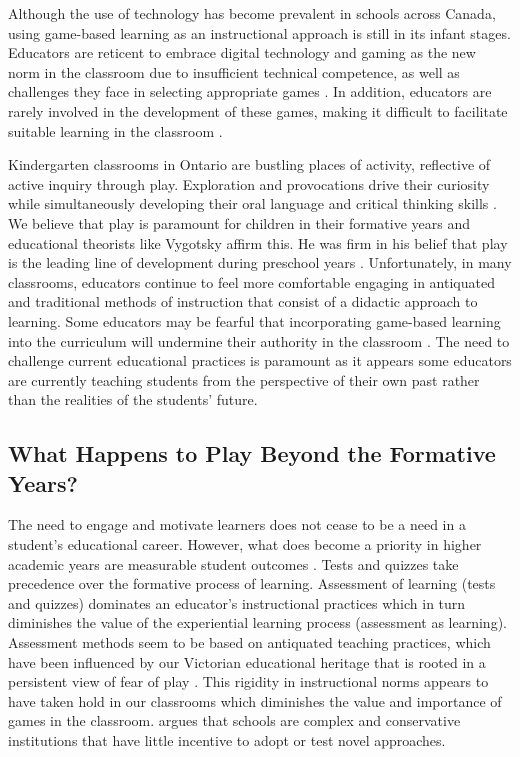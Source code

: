 \documentclass{article}
\begin{document}
Although the use of technology has become prevalent in schools across Canada, using game-based learning as an instructional approach is still in its infant stages. Educators are reticent to embrace digital technology and gaming as the new norm in the classroom due to insufficient technical competence, as well as challenges they face in selecting appropriate games \citep{jaaska2022teachers,molin2017role}. In addition, educators are rarely involved in the development of these games, making it difficult to facilitate suitable learning in the classroom \citep{molin2017role}. 

Kindergarten classrooms in Ontario are bustling places of activity, reflective of active inquiry through play. Exploration and provocations drive their curiosity while simultaneously developing their oral language and critical thinking skills \citep{kindergartencurriculum}. We believe that play is paramount for children in their formative years and educational theorists like Vygotsky affirm this. He was firm in his belief that play is the leading line of development during preschool years \citep{vygotsky1967play}. Unfortunately, in many classrooms, educators continue to feel more comfortable engaging in antiquated and traditional methods of instruction that consist of a didactic approach to learning. Some educators may be fearful that incorporating game-based learning into the curriculum will undermine their authority in the classroom \citep{jaaska2022teachers,chee2014facilitating,jong2016teachers}. The need to challenge current educational practices is paramount as it appears some educators are currently teaching students from the perspective of their own past rather than the realities of the students’ future. 

\subsection{What Happens to Play Beyond the Formative Years?}

The need to engage and motivate learners does not cease to be a need in a student’s educational career. However, what does become a priority in higher academic years are measurable student outcomes \citep{ball2012politics,shore2010beyond,leather2021pedagogy}. Tests and quizzes take precedence over the formative process of learning. Assessment of learning (tests and quizzes) dominates an educator’s instructional practices which in turn diminishes the value of the experiential learning process (assessment as learning). Assessment methods seem to be based on antiquated teaching practices, which have been influenced by our Victorian educational heritage that is rooted in a persistent view of fear of play \citep{wood2013play}. This rigidity in instructional norms appears to have taken hold in our classrooms which diminishes the value and importance of games in the classroom. \citet{reich2020failure} argues that schools are complex and conservative institutions that have little incentive to adopt or test novel approaches. 
\end{document}
